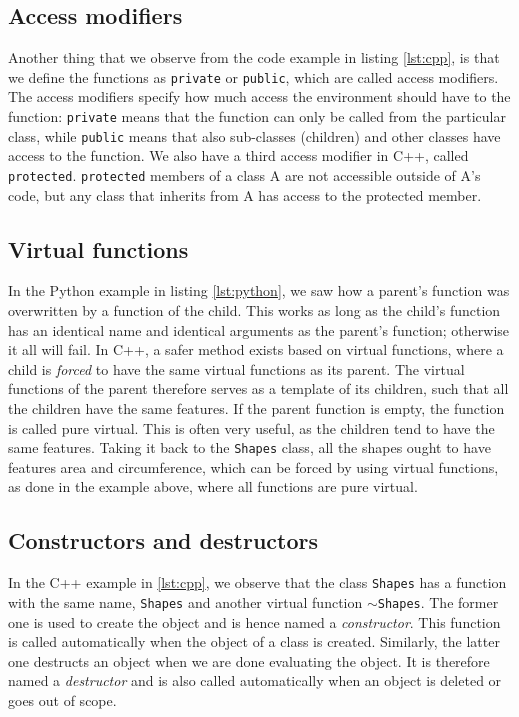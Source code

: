 \subsection{Access modifiers}
Another thing that we observe from the code example in listing \eqref{lst:cpp}, is that we define the functions as \texttt{private} or \texttt{public}, which are called access modifiers. The access modifiers specify how much access the environment should have to the function: \texttt{private} means that the function can only be called from the particular class, while \texttt{public} means that also sub-classes (children) and other classes have access to the function. We also have a third access modifier in C++, called \texttt{protected}. \texttt{protected} members of a class A are not accessible outside of A's code, but any class that inherits from A has access to the protected member. 

\subsection{Virtual functions}
In the Python example in listing \eqref{lst:python}, we saw how a parent's function was overwritten by a function of the child. This works as long as the child's function has an identical name and identical arguments as the parent's function; otherwise it all will fail. In C++, a safer method exists based on virtual functions, where a child is \textit{forced} to have the same virtual functions as its parent. The virtual functions of the parent therefore serves as a template of its children, such that all the children have the same features. If the parent function is empty, the function is called pure virtual. This is often very useful, as the children tend to have the same features. Taking it back to the \texttt{Shapes} class, all the shapes ought to have features area and circumference, which can be forced by using virtual functions, as done in the example above, where all functions are pure virtual.

\subsection{Constructors and destructors}
In the C++ example in \eqref{lst:cpp}, we observe that the class \texttt{Shapes} has a function with the same name, \texttt{Shapes} and another virtual function $\sim$\texttt{Shapes}. The former one is used to create the object and is hence named a \textit{constructor}. This function is called automatically when the object of a class is created. Similarly, the latter one destructs an object when we are done evaluating the object. It is therefore named a \textit{destructor} and is also called automatically when an object is deleted or goes out of scope.

